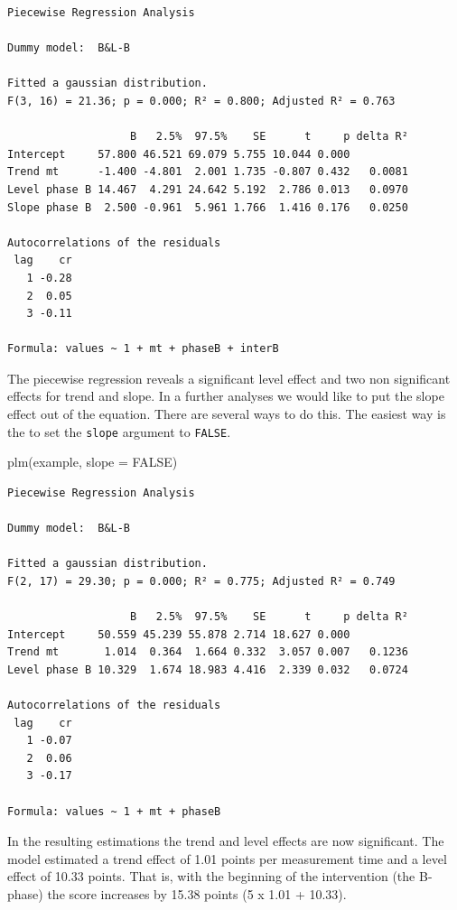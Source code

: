 \documentclass[
]{book}
\newenvironment{Shaded}{\begin{snugshade}}{\end{snugshade}}
\newcommand{\AttributeTok}[1]{\textcolor[rgb]{0.77,0.63,0.00}{#1}}
\newcommand{\ConstantTok}[1]{\textcolor[rgb]{0.00,0.00,0.00}{#1}}
\newcommand{\FunctionTok}[1]{\textcolor[rgb]{0.00,0.00,0.00}{#1}}
\newcommand{\NormalTok}[1]{#1}
\begin{document}
\begin{verbatim}
Piecewise Regression Analysis

Dummy model:  B&L-B 

Fitted a gaussian distribution.
F(3, 16) = 21.36; p = 0.000; R² = 0.800; Adjusted R² = 0.763

                   B   2.5%  97.5%    SE      t     p delta R²
Intercept     57.800 46.521 69.079 5.755 10.044 0.000         
Trend mt      -1.400 -4.801  2.001 1.735 -0.807 0.432   0.0081
Level phase B 14.467  4.291 24.642 5.192  2.786 0.013   0.0970
Slope phase B  2.500 -0.961  5.961 1.766  1.416 0.176   0.0250

Autocorrelations of the residuals
 lag    cr
   1 -0.28
   2  0.05
   3 -0.11

Formula: values ~ 1 + mt + phaseB + interB
\end{verbatim}

The piecewise regression reveals a significant level effect and two non significant effects for trend and slope. In a further analyses we would like to put the slope effect out of the equation. There are several ways to do this. The easiest way is the to set the \texttt{slope} argument to \texttt{FALSE}.

\begin{Shaded}
\begin{Highlighting}[]
\FunctionTok{plm}\NormalTok{(example, }\AttributeTok{slope =} \ConstantTok{FALSE}\NormalTok{)}
\end{Highlighting}
\end{Shaded}

\begin{verbatim}
Piecewise Regression Analysis

Dummy model:  B&L-B 

Fitted a gaussian distribution.
F(2, 17) = 29.30; p = 0.000; R² = 0.775; Adjusted R² = 0.749

                   B   2.5%  97.5%    SE      t     p delta R²
Intercept     50.559 45.239 55.878 2.714 18.627 0.000         
Trend mt       1.014  0.364  1.664 0.332  3.057 0.007   0.1236
Level phase B 10.329  1.674 18.983 4.416  2.339 0.032   0.0724

Autocorrelations of the residuals
 lag    cr
   1 -0.07
   2  0.06
   3 -0.17

Formula: values ~ 1 + mt + phaseB
\end{verbatim}

In the resulting estimations the trend and level effects are now significant. The model estimated a trend effect of 1.01 points per measurement time and a level effect of 10.33 points. That is, with the beginning of the intervention (the B-phase) the score increases by 15.38 points (5 x 1.01 + 10.33).
\end{document}
